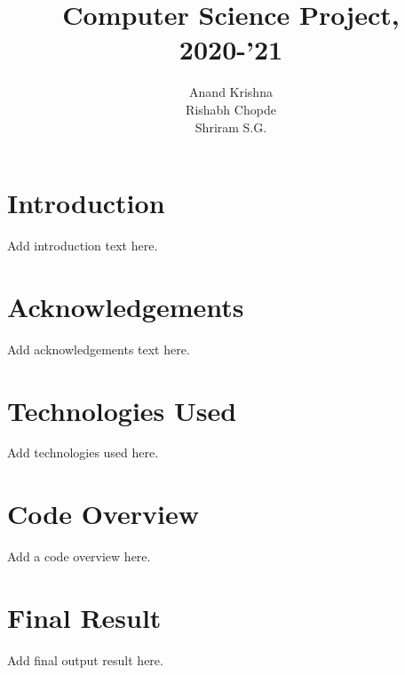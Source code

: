 \documentclass[17pt]{extarticle}
\title{\textbf{Computer Science Project, 2020-'21}}
\author{
    Anand Krishna\\
    \And
    Rishabh Chopde\\
    \And
    Shriram S.G.
    }
\date{\vspace{-5ex}}
\begin{document}
  \maketitle
  \newpage
  \tableofcontents
  
  \newpage
  \section{Introduction}
  Add introduction text here.
  
  \newpage
  \section{Acknowledgements}
  Add acknowledgements text here.
  
  \newpage
  \section{Technologies Used}
  Add technologies used here.
  
  \newpage
  \section{Code Overview}
  Add a code overview here.
  
  \newpage
  \section{Final Result}
  Add final output result here.
  
\end{document}
